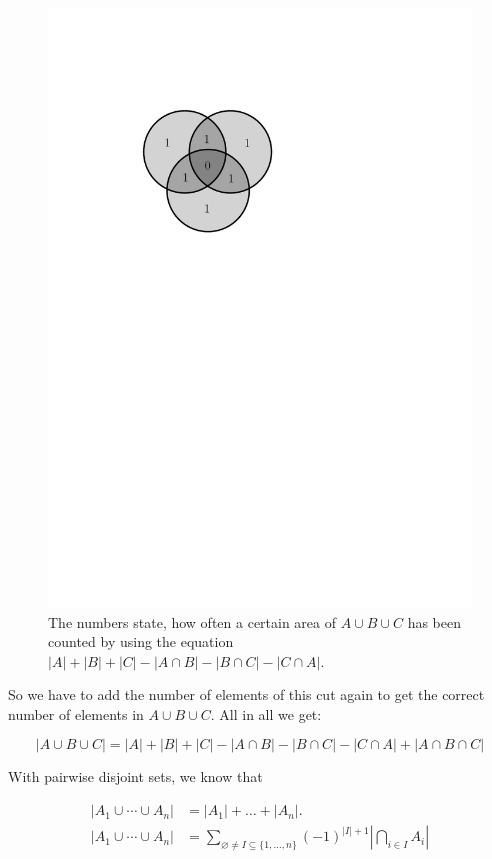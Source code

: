 \begin{figure}[htb]
  \centering
  \includegraphics[scale=.5]{02_higher_combinatorics/pics/a_cut_b_cut_c_2.pdf}
  \caption{The numbers state, how often a certain area of $A \cup B \cup C$ has been counted by using the equation $|A| + |B| + |C| - |A \cap B| - |B \cap C| - |C \cap A|.$}
\end{figure}

So we have to add the number of elements of this cut again to get the correct number of elements in $A \cup B \cup C$.
All in all we get:

\[
  |A \cup B \cup C| = |A| + |B| + |C| - |A \cap B| - |B \cap C| - |C \cap A| + |A \cap B \cap C|
\]


With pairwise disjoint sets, we know that

\begin{align*}
  |A_1\cup \cdots\cup A_n| &= |A_1| + \ldots + |A_n|.\\
  |A_1\cup \cdots\cup A_n| &=
    \sum_{\varnothing\neq I\subseteq\{1,\ldots,n\}}
      (-1)^{|I|+1}
      \left|
        \bigcap_{i\in I} A_i
      \right|
\end{align*}

